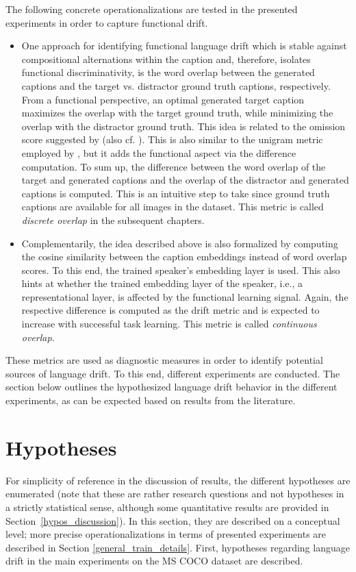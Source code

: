 The following concrete operationalizations are tested in the presented experiments in order to capture functional drift. \begin{itemize}
	\item One approach for identifying functional language drift which is stable against compositional alternations within the caption and, therefore, isolates functional discriminativity, is the word overlap between the generated captions and the target vs. distractor ground truth captions, respectively. From a functional perspective, an optimal generated target caption maximizes the overlap with the target ground truth, while minimizing the overlap with the distractor ground truth. This idea is related to the omission score suggested by \cite{havrylov2017emergence} (also cf. \cite{andreas2016reasoning, gunel2020supervised}). This is also similar to the unigram metric employed by \cite{lazaridou2020multi}, but it adds the functional aspect via the difference computation. To sum up, the difference between the word overlap of the target and generated captions and the overlap of the distractor and generated captions is computed. This is an intuitive step to take since ground truth captions are available for all images in the dataset. This metric is called \textit{discrete overlap} in the subsequent chapters.
	\item Complementarily, the idea described above is also formalized by computing the cosine similarity between the caption embeddings instead of word overlap scores. To this end, the trained speaker's embedding layer is used. This also hints at whether the trained embedding layer of the speaker, i.e., a representational layer, is affected by the functional learning signal. Again, the respective difference is computed as the drift metric and is expected to increase with successful task learning. This metric is called \textit{continuous overlap}.
\end{itemize}
These metrics are used as diagnostic measures in order to identify potential sources of language drift. To this end, different experiments are conducted. The section below outlines the hypothesized language drift behavior in the different experiments, as can be expected based on results from the literature.

\section{Hypotheses}
\label{hypos}

For simplicity of reference in the discussion of results, the different hypotheses are enumerated (note that these are rather research questions and not hypotheses in a strictly statistical sense, although some quantitative results are provided in Section~\ref{hypos_discussion}). In this section, they are described on a conceptual level; more precise operationalizations in terms of presented experiments are described in Section \ref{general_train_details}.
First, hypotheses regarding language drift in the main experiments on the MS COCO dataset are described. 

